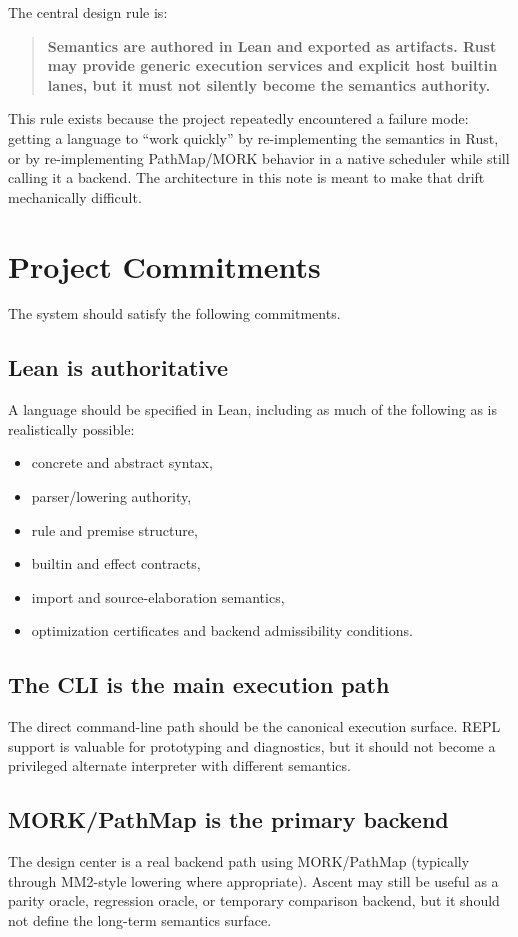 \documentclass[11pt]{article}
\begin{document}
The central design rule is:

\begin{quote}
\textbf{Semantics are authored in Lean and exported as artifacts. Rust may provide generic execution services and explicit host builtin lanes, but it must not silently become the semantics authority.}
\end{quote}

This rule exists because the project repeatedly encountered a failure mode: getting a language to ``work quickly'' by re-implementing the semantics in Rust, or by re-implementing PathMap/MORK behavior in a native scheduler while still calling it a backend. The architecture in this note is meant to make that drift mechanically difficult.

\section{Project Commitments}

The system should satisfy the following commitments.

\subsection{Lean is authoritative}
A language should be specified in Lean, including as much of the following as is realistically possible:
\begin{itemize}
  \item concrete and abstract syntax,
  \item parser/lowering authority,
  \item rule and premise structure,
  \item builtin and effect contracts,
  \item import and source-elaboration semantics,
  \item optimization certificates and backend admissibility conditions.
\end{itemize}

\subsection{The CLI is the main execution path}
The direct command-line path should be the canonical execution surface. REPL support is valuable for prototyping and diagnostics, but it should not become a privileged alternate interpreter with different semantics.

\subsection{MORK/PathMap is the primary backend}
The design center is a real backend path using MORK/PathMap (typically through MM2-style lowering where appropriate). Ascent may still be useful as a parity oracle, regression oracle, or temporary comparison backend, but it should not define the long-term semantics surface.
\end{document}
